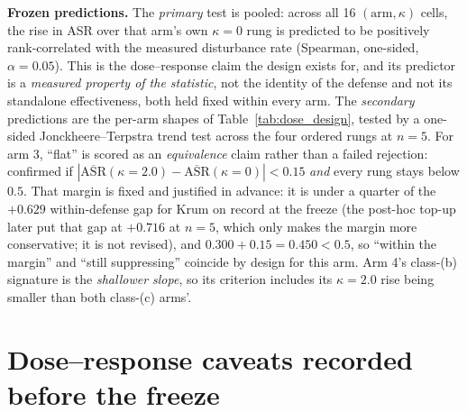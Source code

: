 \documentclass{article}
\begin{document}
\textbf{Frozen predictions.} The \emph{primary} test is pooled: across all 16 $(\text{arm},\kappa)$ cells, the rise in ASR over that arm's own $\kappa{=}0$ rung is predicted to be positively rank-correlated with the measured disturbance rate (Spearman, one-sided, $\alpha = 0.05$). This is the dose--response claim the design exists for, and its predictor is a \emph{measured property of the statistic}, not the identity of the defense and not its standalone effectiveness, both held fixed within every arm. The \emph{secondary} predictions are the per-arm shapes of Table~\ref{tab:dose_design}, tested by a one-sided Jonckheere--Terpstra trend test across the four ordered rungs at $n{=}5$. For arm 3, ``flat'' is scored as an \emph{equivalence} claim rather than a failed rejection: confirmed if $|\overline{\mathrm{ASR}}(\kappa{=}2.0) - \overline{\mathrm{ASR}}(\kappa{=}0)| < 0.15$ \emph{and} every rung stays below $0.5$. That margin is fixed and justified in advance: it is under a quarter of the $+0.629$ within-defense gap for Krum on record at the freeze (the post-hoc top-up later put that gap at $+0.716$ at $n{=}5$, which only makes the margin more conservative; it is not revised), and $0.300 + 0.15 = 0.450 < 0.5$, so ``within the margin'' and ``still suppressing'' coincide by design for this arm. Arm 4's class-(b) signature is the \emph{shallower slope}, so its criterion includes its $\kappa{=}2.0$ rise being smaller than both class-(c) arms'.

\section{Dose--response caveats recorded before the freeze}
\label{app:dose_caveats}
\end{document}

